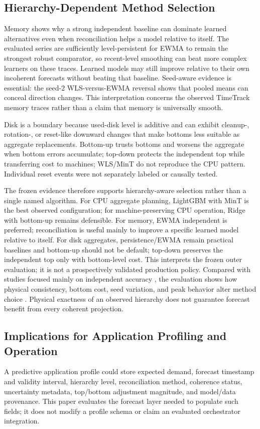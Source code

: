 \documentclass[a4paper,fleqn]{cas-dc}
\begin{document}
\subsection{Hierarchy-Dependent Method Selection}
\label{sec:disc-select}
Memory shows why a strong independent baseline can dominate learned alternatives
even when reconciliation helps a model relative to itself.
The evaluated series are sufficiently level-persistent for {EWMA} to remain the
strongest robust comparator, so recent-level smoothing can beat more complex
learners on these traces.
Learned models may still improve relative to their own incoherent forecasts
without beating that baseline.
Seed-aware evidence is essential: the seed-$2$ {WLS}-versus-{EWMA} reversal
shows that pooled means can conceal direction changes.
This interpretation concerns the observed TimeTrack memory traces rather than a
claim that memory is universally smooth.

Disk is a boundary because used-disk level is additive and can exhibit
cleanup-, rotation-, or reset-like downward changes that make bottoms less
suitable as aggregate replacements.
Bottom-up trusts bottoms and worsens the aggregate when bottom errors accumulate;
top-down protects the independent top while transferring cost to machines;
{WLS}/MinT do not reproduce the {CPU} pattern.
Individual reset events were not separately labeled or causally tested.

The frozen evidence therefore supports hierarchy-aware selection rather than a
single named algorithm.
For {CPU} aggregate planning, LightGBM with MinT is the best observed
configuration; for machine-preserving {CPU} operation, Ridge with bottom-up
remains defensible.
For memory, {EWMA} independent is preferred; reconciliation is useful mainly to
improve a specific learned model relative to itself.
For disk aggregates, persistence/{EWMA} remain practical baselines and bottom-up
should not be default; top-down preserves the independent top only with
bottom-level cost.
This interprets the frozen outer evaluation; it is not a prospectively validated
production policy.
Compared with studies focused mainly on independent accuracy
\cite{masdari2020workload,hyndman2021forecasting}, the evaluation shows how
physical consistency, bottom cost, seed variation, and peak behavior alter method
choice \cite{athanasopoulos2024hierarchical}.
Physical exactness of an observed hierarchy does not guarantee forecast benefit
from every coherent projection.

\subsection{Implications for Application Profiling and Operation}
\label{sec:disc-ops}
A predictive application profile could store expected demand, forecast timestamp
and validity interval, hierarchy level, reconciliation method, coherence status,
uncertainty metadata, top/bottom adjustment magnitude, and model/data provenance.
This paper evaluates the forecast layer needed to populate such fields; it does
not modify a profile schema or claim an evaluated orchestrator integration.
\end{document}
